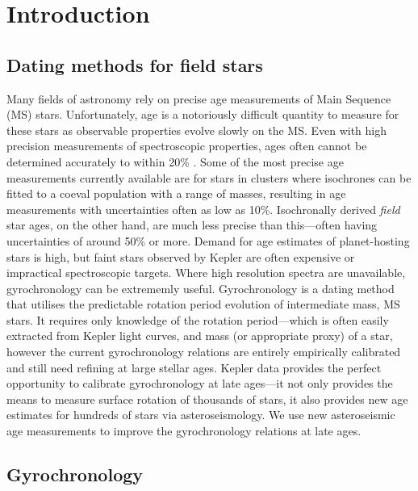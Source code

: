 \documentclass[10pt,preprint]{aastex}
\begin{document}
\section{Introduction}
\label{intro}
\subsection{Dating methods for field stars}

Many fields of astronomy rely on precise age measurements of Main Sequence (MS) stars.
Unfortunately, age is a notoriously difficult quantity to measure for these stars as observable properties evolve slowly on the MS.
Even with high precision measurements of spectroscopic properties, ages often cannot be determined accurately to within 20\% \citep{Soderblom2010}.
Some of the most precise age measurements currently available are for stars in clusters where isochrones can be fitted to a coeval population with a range of masses, resulting in age measurements with uncertainties often as low as 10\%.
Isochronally derived {\it field} star ages, on the other hand, are much less precise than this---often having uncertainties of around 50\% or more.
Demand for age estimates of planet-hosting stars is high, but faint stars observed by Kepler are often expensive or impractical spectroscopic targets.
Where high resolution spectra are unavailable, gyrochronology can be extrememly useful.
Gyrochronology is a dating method that utilises the predictable rotation period evolution of intermediate mass, MS stars.
It requires only knowledge of the rotation period---which is often easily extracted from Kepler light curves, and mass (or appropriate proxy) of a star, however the current gyrochronology relations are entirely empirically calibrated and still need refining at large stellar ages.
Kepler data provides the perfect opportunity to calibrate gyrochronology at late ages---it not only provides the means to measure surface rotation of thousands of stars, it also provides new age estimates for hundreds of stars via asteroseismology.
We use new asteroseismic age measurements to improve the gyrochronology relations at late ages.

\subsection{Gyrochronology}
\end{document}
